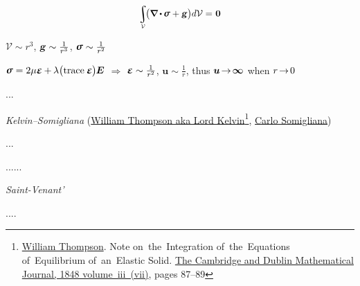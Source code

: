 \nopagebreak\vspace{-0.2em}\begin{equation*}
\scalebox{.81}{$ \displaystyle\integral\displaylimits_{\mathcal{V}} $} \hspace{-0.4ex}
\scalebox{.95}{$ \bigl( \boldnabla \hspace{-0.1ex} \dotp \hspace{-0.1ex} \linearstress
    + \volumeloadvector \bigr) d\mathcal{V}
    = \hspace{.1ex} \zerovector $}
\end{equation*}

\nopagebreak\vspace{-1em}\noindent
\hfill
${\mathcal{V} \sim r^3}$, ${\textbf{\textsl{g}} \sim \frac{1}{r^3}}$, ${\linearstress \sim \frac{1}{r^2}}$

\noindent
\hfill
${\linearstress
= 2 \thesecondlameparameter \infinitesimaldeformation
\hspace{-0.1ex} + \hspace{-0.1ex} \thefirstlameparameter \bigl( \trace{\infinitesimaldeformation} \hspace{-0.1ex} \bigr) \hspace{-0.1ex} \UnitDyad }$
$\Rightarrow$
${\infinitesimaldeformation \sim \frac{1}{r^2}}$, ${\bm{u} \sim \frac{1}{r}}$,
thus ${\bm{u} \hspace{-0.33ex}\to\hspace{-0.33ex} \bm{\infty}}$ when ${r \hspace{-0.33ex}\to\hspace{-0.33ex} 0}$

...

\noindent
\emph{ Kelvin\hbox{--}Somigliana}
(\href{https://en.wikipedia.org/wiki/Lord_Kelvin}{William Thompson aka Lord Kelvin}\footnote{%
\href{https://en.wikipedia.org/wiki/Lord_Kelvin}{William  Thompson}.
Note on~the~Integration of~the~Equations of~Equilibrium of~an~Elastic Solid.
\href{https://ia904507.us.archive.org/25/items/sim_cambridge-and-dublin-mathematical-journal_1848_7/sim_cambridge-and-dublin-mathematical-journal_1848_7.pdf}{The Cambridge and Dublin Mathematical Journal, 1848 volume~iii~(vii)},
pages 87\hbox{--}89
}\hbox{\hspace{-0.55ex},}
\href{https://en.wikipedia.org/wiki/Carlo_Somigliana}{Carlo Somigliana})

... ~

......

\noindent
\emph{ Saint-Venant’}

....
